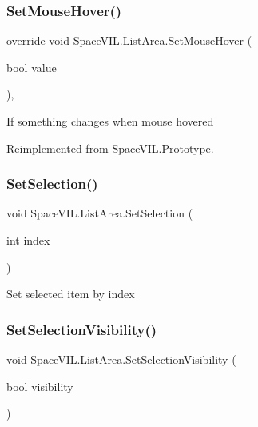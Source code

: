 \subsubsection{\texorpdfstring{Set\+Mouse\+Hover()}{SetMouseHover()}}
{\footnotesize\ttfamily override void Space\+V\+I\+L.\+List\+Area.\+Set\+Mouse\+Hover (\begin{DoxyParamCaption}\item[{bool}]{value }\end{DoxyParamCaption})\hspace{0.3cm}{\ttfamily [inline]}, {\ttfamily [virtual]}}



If something changes when mouse hovered 



Reimplemented from \mbox{\hyperlink{class_space_v_i_l_1_1_prototype}{Space\+V\+I\+L.\+Prototype}}.

\mbox{\label{class_space_v_i_l_1_1_list_area_a4a0e42a96f357bf2f0c58731ade71ffd}} 
\subsubsection{\texorpdfstring{Set\+Selection()}{SetSelection()}}
{\footnotesize\ttfamily void Space\+V\+I\+L.\+List\+Area.\+Set\+Selection (\begin{DoxyParamCaption}\item[{int}]{index }\end{DoxyParamCaption})\hspace{0.3cm}{\ttfamily [inline]}}



Set selected item by index 

\mbox{\label{class_space_v_i_l_1_1_list_area_afb9baa1b6b71d8223b3b2b86ed95dce1}} 
\subsubsection{\texorpdfstring{Set\+Selection\+Visibility()}{SetSelectionVisibility()}}
{\footnotesize\ttfamily void Space\+V\+I\+L.\+List\+Area.\+Set\+Selection\+Visibility (\begin{DoxyParamCaption}\item[{bool}]{visibility }\end{DoxyParamCaption})\hspace{0.3cm}{\ttfamily [inline]}}



